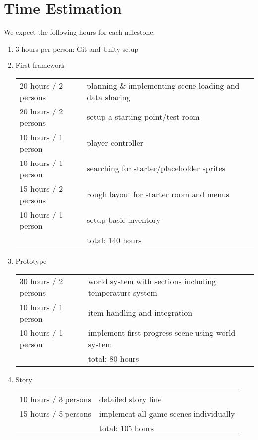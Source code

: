 \documentclass[a4paper]{scrreprt}
\begin{document}
\section{Time Estimation}

We expect the following hours for each milestone:

\begin{enumerate}
    \item 3 hours per person: Git and Unity setup
    \item First framework \\
    \begin{tabularx}{\linewidth}{lX}
        20 hours / 2 persons & planning \& implementing scene loading and data sharing \\
        20 hours / 2 persons & setup a starting point/test room \\
        10 hours / 1 person & player controller \\
        10 hours / 1 person & searching for starter/placeholder sprites \\
        15 hours / 2 persons & rough layout for starter room and menus \\
        10 hours / 1 person & setup basic inventory \\
        \cline{2-2} & total: 140 hours \\
    \end{tabularx}
    \item Prototype \\
    \begin{tabularx}{\linewidth}{lX}
        30 hours / 2 persons & world system with sections including temperature system \\
        10 hours / 1 person & item handling and integration \\
        10 hours / 1 person & implement first progress scene using world system \\
        \cline{2-2} & total: 80 hours \\
    \end{tabularx}
    \item Story \\
    \begin{tabularx}{\linewidth}{lX}
        10 hours / 3 persons & detailed story line \\
        15 hours / 5 persons & implement all game scenes individually \\
        \cline{2-2} & total: 105 hours \\
    \end{tabularx}

\end{enumerate}
\end{document}
